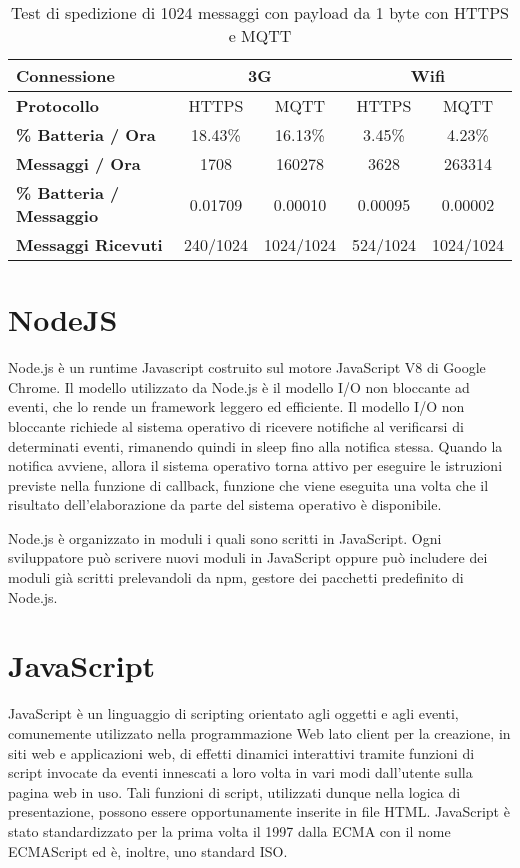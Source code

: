 \begin{table}
	\caption{Test di spedizione di 1024 messaggi con payload da 1 byte con HTTPS e MQTT}
	\label{tab:https-vs-mqtt}
	\begin{center}
		\begin{tabular}{lcccc}
			\toprule
			\textbf{Connessione} 				& \multicolumn{2}{c}{3G} & \multicolumn{2}{c}{Wifi} \\
			\midrule
			\textbf{Protocollo} 				& HTTPS 		& MQTT 			& HTTPS 		& MQTT \\
			\midrule
			\textbf{\% Batteria / Ora} 			& 18.43\% 		& 16.13\% 		& 3.45\% 		& 4.23\% \\
			\textbf{Messaggi / Ora} 			& 1708 			& 160278 		& 3628 			& 263314 \\
			\textbf{\% Batteria / Messaggio} 	& 0.01709 		& 0.00010 		& 0.00095		& 0.00002 \\
			\textbf{Messaggi Ricevuti} 			& 240/1024 		& 1024/1024 	& 524/1024 		& 1024/1024 \\
			\bottomrule
		\end{tabular}
	\end{center}
\end{table}


\section{NodeJS}
Node.js \cite{node:site} è un runtime Javascript costruito sul motore JavaScript V8 di Google Chrome. Il modello utilizzato da Node.js è il modello I/O non bloccante ad eventi, che lo rende un framework leggero ed efficiente. Il modello I/O non bloccante richiede al sistema operativo di ricevere notifiche al verificarsi di determinati eventi, rimanendo quindi in sleep fino alla notifica stessa. Quando la notifica avviene, allora il sistema operativo torna attivo per eseguire le istruzioni previste nella funzione di callback, funzione che viene eseguita una volta che il risultato dell'elaborazione da parte del sistema operativo è disponibile.

Node.js è organizzato in moduli i quali sono scritti in JavaScript. Ogni sviluppatore può scrivere nuovi moduli in JavaScript oppure può includere dei moduli già scritti prelevandoli da npm, gestore dei pacchetti predefinito di Node.js.

\section{JavaScript}
JavaScript \cite{javascript:site} è un linguaggio di scripting orientato agli oggetti e agli eventi, comunemente utilizzato nella programmazione Web lato client per la creazione, in siti web e applicazioni web, di effetti dinamici interattivi tramite funzioni di script invocate da eventi innescati a loro volta in vari modi dall'utente sulla pagina web in uso. Tali funzioni di script, utilizzati dunque nella logica di presentazione, possono essere opportunamente inserite in file HTML. JavaScript è stato standardizzato per la prima volta il 1997 dalla ECMA con il nome ECMAScript ed è, inoltre, uno standard ISO.

